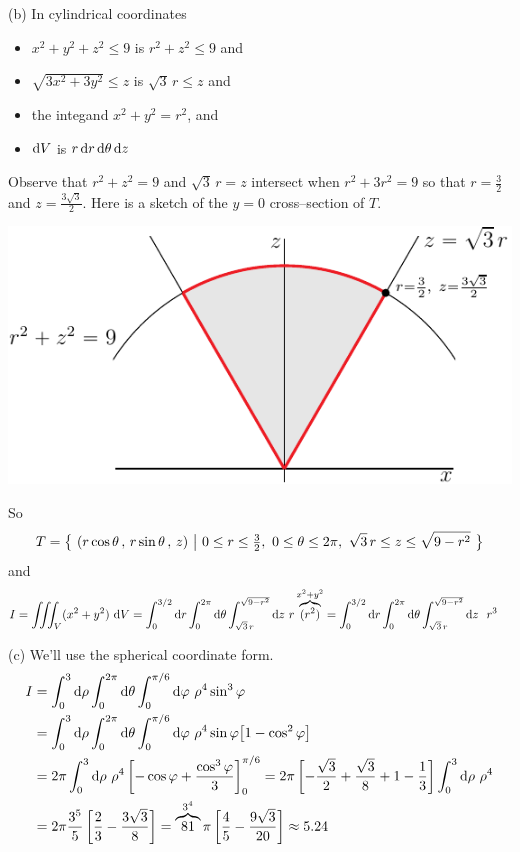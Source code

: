 \begin{solution}
(b)
In cylindrical coordinates
\begin{itemize}
\item
$x^2+y^2+z^2\le 9$ is $r^2+z^2\le 9$ and
\item
$\sqrt{3 x^2+3 y^2}\le z$ is $\sqrt{3}\,r\le z$ and
\item
the integand $x^2+y^2=r^2$, and
\item
$\mathrm{d}V$ is $r\,\mathrm{d}r\,\mathrm{d}\theta\,\mathrm{d}z$
\end{itemize}
Observe that $r^2+z^2= 9$ and $\sqrt{3}\,r= z$ intersect when $r^2+3r^2=9$ so that $r=\frac{3}{2}$ and $z=\frac{3\sqrt{3}}{2}$.
Here is a sketch of the $y=0$ cross--section of $T$.
\begin{center}
     \includegraphics[scale=1.0]{fig/OE10A_8.pdf}
\end{center}
So
\begin{equation*}
T =\Set{(r\cos\theta\,,\,r\sin\theta\,,\,z)}{0\le r\le \tfrac{3}{2},\ 
                                             0\le\theta\le2\pi,\ 
                                          \sqrt{3}\,r\le z\le \sqrt{9-r^2}}
\end{equation*}
and
\begin{align*}
I &=\tripInt_V (x^2+y^2)\ \dee{V} 
   =\int_0^{3/2}\dee{r}\int_0^{2\pi}\dee{\theta}
           \int_{\sqrt{3}\,r}^{\sqrt{9-r^2}}\dee{z}\ 
                               r\overbrace{(r^2)}^{x^2+y^2}
   =\int_0^{3/2}\dee{r}\int_0^{2\pi}\dee{\theta}
                          \int_{\sqrt{3}\,r}^{\sqrt{9-r^2}}\dee{z}\ \ r^3
\end{align*}


(c) We'll use the spherical coordinate form.
\begin{align*}
I  &=\int_0^{3}\mathrm{d}\rho\int_0^{2\pi}\mathrm{d}\theta
           \int_0^{\pi/6}\mathrm{d}\varphi\ \rho^4\sin^3\varphi \\
   &=\int_0^{3}\mathrm{d}\rho\int_0^{2\pi}\mathrm{d}\theta
           \int_0^{\pi/6}\mathrm{d}\varphi\ \rho^4\sin\varphi
              \big[1-\cos^2\varphi\big] \\
   &=2\pi \int_0^3\mathrm{d}\rho\ \rho^4
                \left[-\cos\varphi +\frac{\cos^3\varphi}{3}\right]_0^{\pi/6}
    =2\pi \left[-\frac{\sqrt{3}}{2} + \frac{\sqrt{3}}{8}+1-\frac{1}{3}\right]
                      \int_0^3\mathrm{d}\rho\ \rho^4 \\
    &=2\pi \frac{3^5}{5}\left[\frac{2}{3} - \frac{3\sqrt{3}}{8}\right]
     =\overbrace{81}^{3^4}\pi \left[\frac{4}{5} - \frac{9\sqrt{3}}{20}\right]
     \approx 5.24
\end{align*}
\end{solution}

